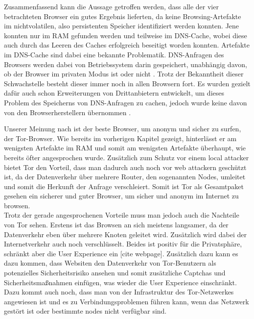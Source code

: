 \begin{comment}
Weiterführende Arbeiten:
> Cross-mode interference \cite{Hedberg.2013}:
	o	the Chrome://memory page displays all the opened tabs in the browser regardless if they are in the usual or private mode -> Nicht mehr aktuell -> Stattdessen: Chrome Task-manager (Ctrl + Esc), Funktioniert auch bei Firefox
> Unser Scope: Process Monitor nach Prozessnamen gefiltert
	- Weiterführend: Nach Pathnamen filtern: "Common Locations"

> Für wen wird Browser entwickelt
> Warum und für wen wird Private Browsing analysiert?
> Ist das Auffinden privater Browsing Artefakte Schuld von Browser Entwicklern? (Oder Schuld des Betriebssystem, wie in (TODO!) erwähnt)
\end{comment}

Zusammenfassend kann die Aussage getroffen werden, dass alle der vier betrachteten Browser ein gutes Ergebnis lieferten, da keine Browsing-Artefakte im nichtvolatilen, also persistenten Speicher identifiziert werden konnten. Jene konnten nur im RAM gefunden werden und teilweise im DNS-Cache, wobei diese auch durch das Leeren des Caches erfolgreich beseitigt worden konnten. Artefakte im DNS-Cache sind dabei eine bekannte Problematik. DNS-Anfragen des Browsers werden dabei von Betriebssystem darin gespeichert, unabhängig davon, ob der Browser im privaten Modus ist oder nicht \cite{Satvat.2014}. Trotz der Bekanntheit dieser Schwachstelle besteht dieser immer noch in allen Browsern fort. Es wurden gezielt dafür auch schon Erweiterungen von Drittanbietern entwickelt, um dieses Problem des Speicherns von DNS-Anfragen zu cachen, jedoch wurde keine davon von den Browserherstellern übernommen \cite{Satvat.2014}. 

Unserer Meinung nach ist der beste Browser, um anonym und sicher zu surfen, der Tor-Browser. Wie bereits im vorherigen Kapitel gezeigt, hinterlässt er am wenigsten Artefakte im RAM und somit am wenigsten Artefakte überhaupt, wie bereits öfter angesprochen wurde. Zusätzlich zum Schutz vor einem local attacker bietet Tor den Vorteil, dass man dadurch auch noch vor web attackern geschützt ist, da der Datenverkehr über mehrere Router, den sogenannten Nodes, umleitet und somit die Herkunft der Anfrage verschleiert. Somit ist Tor als Gesamtpaket gesehen ein sicherer und guter Browser, um sicher und anonym im Internet zu browsen. \\
Trotz der gerade angesprochenen Vorteile muss man jedoch auch die Nachteile von Tor sehen. Erstens ist das Browsen an sich meistens langsamer, da der Datenverkehr eben über mehrere Knoten geleitet wird. Zusätzlich wird dabei der Internetverkehr auch noch verschlüsselt. Beides ist positiv für die Privatsphäre, schränkt aber die User Experience ein [cite webpage]. Zusätzlich dazu kann es dazu kommen, dass Websiten den Datenverkehr von Tor-Benutzern als potenzielles Sicherheitsrisiko ansehen und somit zusätzliche Captchas und Sicherheitsmaßnahmen einfügen, was wieder die User Experience einschränkt. Dazu kommt auch noch, dass man von der Infrastruktur des Tor-Netzwerkes angewiesen ist und es zu Verbindungsproblemen führen kann, wenn das Netzwerk gestört ist oder bestimmte nodes nicht verfügbar sind. 

